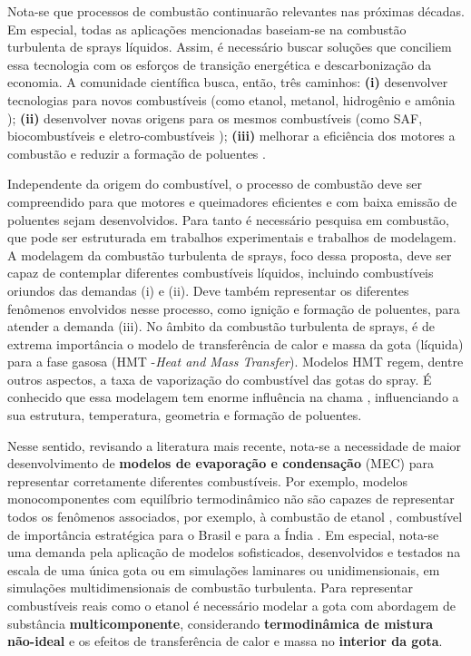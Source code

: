 Nota-se que processos de combustão continuarão relevantes nas próximas décadas.
Em especial, todas as aplicações mencionadas baseiam-se na combustão turbulenta de sprays líquidos.
Assim, é necessário buscar soluções que conciliem essa tecnologia com os esforços de transição energética e descarbonização da economia.
A comunidade científica busca, então, três caminhos: \textbf{(i)} desenvolver tecnologias para novos combustíveis (como  etanol, metanol, hidrogênio e amônia \cite{FAPESP_etanol_1,VerhelstS2019,TeohY2023,ElbazA2022}); \textbf{(ii)} desenvolver novas origens para os mesmos combustíveis (como SAF, biocombustíveis e eletro-combustíveis \cite{BenJames-SAF,BergthorsonJ2015,WestbrookC2019,PalysM2022}); \textbf{(iii)} melhorar a eficiência dos motores a combustão e reduzir a formação de poluentes \cite{MasriA2021}.

Independente da origem do combustível, o processo de combustão deve ser compreendido para que motores e queimadores eficientes e com baixa emissão de poluentes sejam desenvolvidos.
Para tanto é necessário pesquisa em combustão, que pode ser estruturada em trabalhos experimentais e trabalhos de modelagem.
A modelagem da combustão turbulenta de sprays, foco dessa proposta, deve ser capaz de contemplar diferentes combustíveis líquidos, incluindo combustíveis oriundos das demandas (i) e (ii).
Deve também representar os diferentes fenômenos envolvidos nesse processo, como ignição e formação de poluentes, para atender a demanda (iii).
No âmbito da combustão turbulenta de sprays, é de extrema importância o modelo de transferência de calor e massa da gota (líquida) para a fase gasosa (HMT -\emph{Heat and Mass Transfer}).
Modelos HMT regem, dentre outros aspectos, a taxa de vaporização do combustível das gotas do spray.
É conhecido que essa modelagem tem enorme influência na chama \cite{JennyB2012}, influenciando a sua estrutura, temperatura, geometria e formação de poluentes.


Nesse sentido, revisando a literatura mais recente, nota-se a necessidade de maior desenvolvimento de \textbf{modelos de evaporação e condensação} (MEC) para representar corretamente diferentes combustíveis.
Por exemplo, modelos monocomponentes com equilíbrio termodinâmico não são capazes de representar todos os fenômenos associados, por exemplo, à combustão de etanol \cite{SacomanoF2024CF}, combustível de importância estratégica para o Brasil e para a Índia \cite{etanol-BNDES,etanol-India}.
Em especial, nota-se uma demanda pela aplicação de modelos sofisticados, desenvolvidos e testados na escala de uma única gota ou em simulações
laminares ou unidimensionais, em simulações multidimensionais de combustão turbulenta.
Para representar combustíveis reais como o etanol é necessário modelar a gota com abordagem de substância \textbf{multicomponente}, considerando \textbf{termodinâmica de mistura não-ideal} e os efeitos de transferência de calor e massa no \textbf{interior da gota}.

